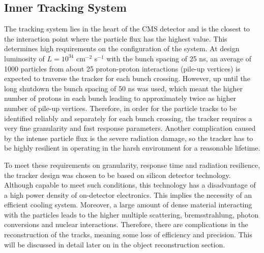 \subsection{Inner Tracking System}
The tracking system lies in the heart of the CMS detector and is the closest to the interaction point where the particle
flux has the highest value. This determines high requirements on the configuration of the system. At design luminosity
of $L = 10^{34}$ cm$^{-2}$ s$^{-1}$ with the bunch spacing of 25 ns, an average of 1000 particles from about 25
proton-proton interactions (pile-up vertices) is expected to traverse the tracker for each bunch crossing. However, up
until the long shutdown the bunch spacing of 50 ns was used, which meant the higher number of protons in each bunch
leading to approximately twice as higher number of pile-up vertices. Therefore, in order for the particle tracks to be
identified reliably and separately for each bunch crossing, the tracker requires a very fine granularity and fast
response parameters. Another complication caused by the intense particle flux is the severe radiation damage, so the
tracker has to be highly resilient in operating in the harsh environment for a reasonable lifetime.

To meet these requirements on granularity, response time and radiation resilience, the tracker design was chosen to be
based on silicon detector technology. Although capable to meet such conditions, this technology has a disadvantage of a
high power density of on-detector electronics. This implies the necessity of an efficient cooling system. Moreover, a
large amount of dense material interacting with the particles leads to the higher multiple scattering, bremsstrahlung,
photon conversions and nuclear interactions. Therefore, there are complications in the reconstruction of the tracks,
meaning some loss of efficiency and precision. This will be discussed in detail later on in the object reconstruction
section.

